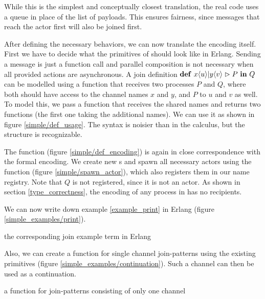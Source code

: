 
While this is the simplest and conceptually closest translation,
the real code uses a queue in place of the list of payloads.
This ensures fairness, since messages that reach the actor first
will also be joined first.


After defining the necessary behaviors,
we can now translate the encoding itself.
First we have to decide what the primitives of \joincalc should look like
in Erlang.
Sending a message is just a function call and parallel composition
is not necessary when all provided actions are asynchronous.
A join definition
$\textbf{\textup{def}} \ x\langle u\rangle | y\langle v\rangle \vartriangleright P \ \textbf{\textup{in}} \ Q$
can be modelled using a function that receives two processes $P$ and $Q$,
where both should have access to the channel names $x$ and $y$,
and $P$ to $u$ and $v$ as well.
To model this, we pass a function that receives the shared names and
returns two functions (the first one taking the additional names).
We can use it as shown in figure \ref{simple/def_usage}.
The syntax is noisier than in the calculus, but the structure is recognizable.


The  function (figure \ref{simple/def_encoding})
is again in close correspondence with the formal encoding.
We create new \actorname{}s and spawn all necessary actors
using the  function (figure \ref{simple/spawn_actor}),
which also registers them in our name registry.
Note that $Q$ is not registered, since it is not an actor.
As shown in section \ref{type_correctness},
the encoding of any process in \joincalc has no recipients.



\begin{example}
  We can now write down example \ref{example_print} in Erlang
  (figure \ref{simple_examples/print}).

  {the corresponding join example term in Erlang}
\end{example}

\begin{example}
  Also, we can create a function for single channel join-patterns using the
  existing primitives
  (figure \ref{simple_examples/continuation}).
  Such a channel can then be used as a continuation.

  {a function for join-patterns consisting of only one channel}
\end{example}
